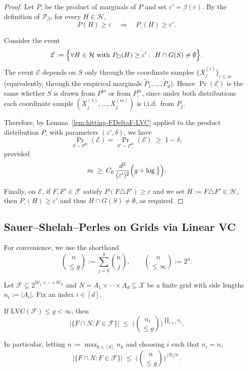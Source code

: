 \documentclass[arxiv]{colt2026}
\newcommand{\X}{\mathcal{X}}
\newcommand{\F}{\mathcal{F}}
\newcommand{\W}{\mathcal{W}}
\newcommand{\Hc}{\mathcal{H}}
\newcommand{\Pc}{\mathcal{P}}
\newcommand{\eps}{\varepsilon}
\newcommand{\LVC}{\mathrm{LVC}}
\newcommand{\binomle}[2]{\binom{#1}{\le #2}}
\begin{document}
\begin{proof}
Let $P_\square$ be the product of marginals of $P$ and set $\eps'=\beta(\eps)$.
By the definition of $\Pc_\beta$, for every $H\in\Hc$,
\[
P(H)\ge\eps \quad\Longrightarrow\quad P_\square(H)\ge\eps'.
\]

Consider the event
\[
\mathcal{E}
:=
\Bigl\{
\forall H\in\Hc \text{ with } P_\square(H)\ge\eps' :\ H\cap G(S)\neq\emptyset
\Bigr\}.
\]
The event $\mathcal{E}$ depends on $S$ only through the coordinate samples
$\{X^{(i)}_j\}_{i\le m}$ (equivalently, through the empirical marginals
$\tilde P_1,\dots,\tilde P_d$). Hence $\Pr(\mathcal{E})$ is the same whether
$S$ is drawn from $P^{m}$ or from $P_\square^{m}$, since under
both distributions each coordinate sample $(X_j^{(1)},\dots,X_j^{(m)})$ is i.i.d.\
from $P_j$.

Therefore, by Lemma~\ref{lem:hitting-FDeltaF-LVC} applied to the product
distribution $P_\square$ with parameters $(\eps',\delta)$, we have
\[
\Pr_{S\sim P^{m}}(\mathcal{E})
=
\Pr_{S'\sim P_\square^{m}}(\mathcal{E})
\;\ge\;
1-\delta,
\]
provided
\[
m \;\ge\; C_0\,\frac{d^2}{(\eps')^2}\Bigl(g + \log\tfrac{1}{\delta}\Bigr).
\]

Finally, on $\mathcal{E}$, if $F,F'\in\F$ satisfy $P(F\triangle F')\ge\eps$ and
we set $H:=F\triangle F'\in\Hc$, then $P_\square(H)\ge\eps'$ and thus
$H\cap G(S)\neq\emptyset$, as required.
\end{proof}

\subsection{Sauer–Shelah–Perles on Grids via Linear VC}\label{sec:proof-grid-ssp}

For convenience, we use the shorthand
\[
\binomle{n}{g} := \sum_{j=0}^{g} \binom{n}{j},
\qquad
\binomle{n}{\infty}:=2^n.
\]

\begin{lemma}
\label{lem:grid-ssp}
Let \(\F \subseteq 2^{\W_1\times\cdots\times\W_d}\) and 
\(N = A_1\times\cdots\times A_d \subseteq \X\) be a finite grid with side lengths
\(n_i := |A_i|\).
Fix an index \(i \in [d]\).

If \(\LVC(\F) \le g < \infty\), then
\begin{equation}
\label{eq:grid-ssp}
\big|\{F \cap N : F \in \F\}\big|
\;\le\;
\Bigg(\binomle{n_i}{g}\Bigg)^{\,\prod_{j\ne i} n_j}.
\end{equation}

In particular, letting \(n:=\max_{k\in[d]} n_k\) and choosing \(i\) such that \(n_i=n\),
\begin{equation}
\label{eq:grid-ssp-maxside}
\big|\{F \cap N : F \in \F\}\big|
\;\le\;
\Big(\binomle{n}{g}\Big)^{\,|N|/n}.
\end{equation}
\end{lemma}
\end{document}
